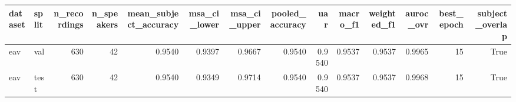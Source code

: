 \begin{tabular}{llrrrrrrrrrrrr}
\toprule
dataset & split & n_recordings & n_speakers & mean_subject_accuracy & msa_ci_lower & msa_ci_upper & pooled_accuracy & uar & macro_f1 & weighted_f1 & auroc_ovr & best_epoch & subject_overlap \\
\midrule
eav & val & 630 & 42 & 0.9540 & 0.9397 & 0.9667 & 0.9540 & 0.9540 & 0.9537 & 0.9537 & 0.9965 & 15 & True \\
eav & test & 630 & 42 & 0.9540 & 0.9349 & 0.9714 & 0.9540 & 0.9540 & 0.9537 & 0.9537 & 0.9968 & 15 & True \\
\bottomrule
\end{tabular}
